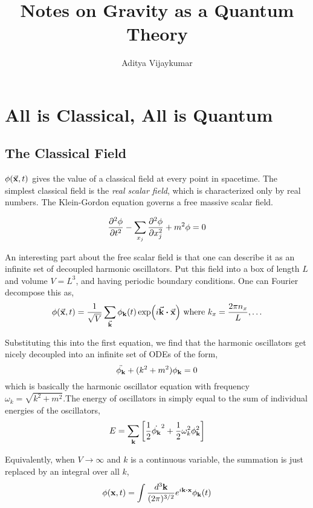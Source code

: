 \documentclass[a4paper,11pt]{article}
\title{\textbf{Notes on Gravity as a Quantum Theory}}
\author{Aditya Vijaykumar}
\affiliation{International Centre for Theoretical Sciences, Bengaluru, India.}
\begin{document}
\maketitle

\section{All is Classical, All is Quantum}

\subsection{The Classical Field}
$\phi(\va{x},t)$ gives the value of a classical field at every point in spacetime. The simplest classical field is the \textit{real scalar field}, which is characterized only by real numbers. The Klein-Gordon equation governs a free massive scalar field.

$$\pdv[2]{\phi}{t} - \sum_{x_j} \pdv[2]{\phi}{x_j} + m^2 \phi =0 $$

An interesting part about the free scalar field is that one can describe it as an infinite set of decoupled harmonic oscillators. Put this field into a box of length $L$ and volume $V=L^3$, and having periodic boundary conditions. One can Fourier decompose this as,
$$\phi(\va{x},t) = \frac{1}{\sqrt{V}} \sum_{\va{k}} \phi_{\vb{k}} (t) \exp(i \va{k}\vdot\va{x}) \text{ where } k_x =\frac
{2\pi n_x}{L} ,\ldots$$

Substituting this into the first equation, we find that the harmonic oscillators get nicely decoupled into an infinite set of ODEs of the form,
$$\ddot{\phi_{\vb{k}}} +(k^2+m^2)\phi_{\vb{k}} = 0$$
which is basically the harmonic oscillator equation with frequency $\omega_k = \sqrt{k^2 + m^2}$.The energy of oscillators in simply equal to the sum of individual energies of the oscillators,
$$E = \sum_{\vb{k}}\left[ \frac{1}{2} \dot{\phi_{\vb{k}}}^2 + \frac{1}{2}\omega_k^2 \phi_{\vb{k}}^2 \right]$$

Equivalently, when $V \rightarrow \infty $ and $k$ is a continuous variable, the summation is just replaced by an integral over all $k$,
$$\phi(\vb{x},t)= \int \frac{d^3\vb{k}}{(2\pi)^{3/2}}e^{i \vb{k} \vdot \vb{x}} \phi_{\vb{k}}(t)$$
\end{document}
